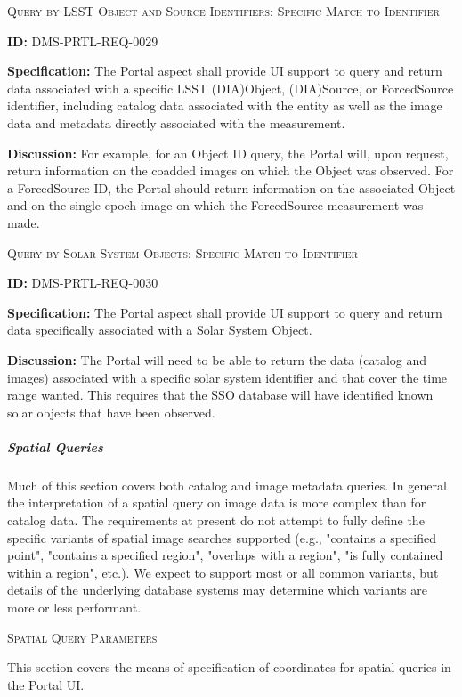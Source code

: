\documentclass[SE,toc]{lsstdoc}
\begin{document}
\textsc{Query by LSST Object and Source Identifiers: Specific Match to Identifier}

\label{DMS-PRTL-REQ-0029}
\textbf{ID:} DMS-PRTL-REQ-0029

\textbf{Specification:}
The Portal aspect shall provide UI support to query and return data associated with a specific LSST (DIA)Object, (DIA)Source, or ForcedSource identifier, including catalog data associated with the entity as well as the image data and metadata directly associated with the measurement.

\textbf{Discussion:}
For example, for an Object ID query, the Portal will, upon request, return information on the coadded images on which the Object was observed.  For a ForcedSource ID, the Portal should return information on the associated Object and on the single-epoch image on which the ForcedSource measurement was made.

\textsc{Query by Solar System Objects: Specific Match to Identifier}

\label{DMS-PRTL-REQ-0030}
\textbf{ID:} DMS-PRTL-REQ-0030

\textbf{Specification:}
The Portal aspect shall provide UI support to query and return data specifically associated with a Solar System Object.

\textbf{Discussion:}
The Portal will need to be able to return the data (catalog and images) associated with a specific solar system identifier and that cover the time range wanted.  This requires that the SSO database will have identified known solar objects that have been observed.

\subparagraph{Spatial Queries}\hfill  %

Much of this section covers both catalog and image metadata queries.  In general the interpretation of a spatial query on image data is more complex than for catalog data.  The requirements at present do not attempt to fully define the specific variants of spatial image searches supported (e.g., "contains a specified point", "contains a specified region", "overlaps with a region", "is fully contained within a region", etc.).  We expect to support most or all common variants, but details of the underlying database systems may determine which variants are more or less performant.

\textsc{Spatial Query Parameters}

This section covers the means of specification of coordinates for spatial queries in the Portal UI.
\end{document}
